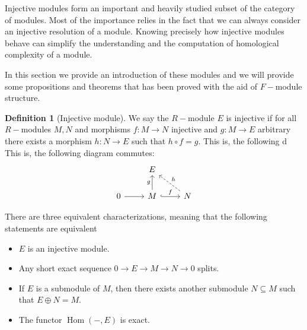 \documentclass[leqno]{article}
\theoremstyle{definition}
\newtheorem{definition}{Definition}[section]
\DeclareMathOperator{\Hom}{Hom}
\begin{document}
Injective modules form an important and heavily studied subset of the category of modules. Most of the importance relies in the fact that we can always consider an injective resolution of a module. Knowing precisely how injective modules behave can simplify the understanding and the computation of homological complexity of a module.

In this section we provide an introduction of these modules and we will provide some propositions and theorems that has been proved with the aid of $F-$module structure.

\begin{definition}[Injective module] We say the $R-$module $E$ is injective if for all $R-$modules $M, N$ and morphisms $f:M\to N$ injective and $g:M\to E$ arbitrary there exists a morphism  $h:N\to E$ such that $h\circ f=g$. This is, the following d This is, the following diagram commutes:
\[\begin{tikzcd}
	& E \\
	0 & M & N
	\arrow[from=2-1, to=2-2]
	\arrow["g", from=2-2, to=1-2]
	\arrow["f", hook, from=2-2, to=2-3]
	\arrow["h"', dashed, from=2-3, to=1-2]
\end{tikzcd}\]
\end{definition}

There are three equivalent characterizations, meaning that the following statements are equivalent
\begin{itemize}[topsep=-6pt, itemsep=0pt]
  \item $E$ is an injective module.
  \item Any short exact sequence $0\to E \to M \to N \to 0$ splits.
  \item If $E$ is a submodule of $M$, then there exists another submodule $N\subseteq M$ such that $E \oplus N = M$.
  \item The functor  $\Hom(-,E)$ is exact.
\end{itemize}
\end{document}
